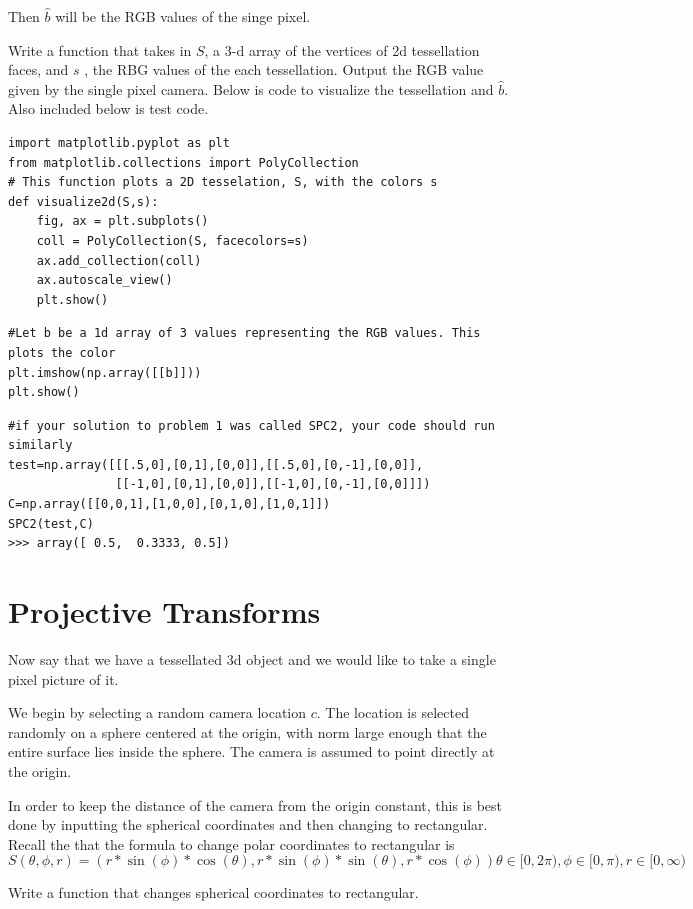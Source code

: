 Then $\hat{b}$ will be the RGB values of the singe pixel.

\begin{problem}
Write a function that takes in $S$, a 3-d array of the vertices of 2d tessellation faces, and $s$ , the RBG values of the each tessellation. Output the RGB value given by the single pixel camera. Below is code to visualize the tessellation and $\hat{b}$.  Also included below is test code.
\end{problem}

\begin{lstlisting}
import matplotlib.pyplot as plt
from matplotlib.collections import PolyCollection
# This function plots a 2D tesselation, S, with the colors s 
def visualize2d(S,s):
    fig, ax = plt.subplots()
    coll = PolyCollection(S, facecolors=s)
    ax.add_collection(coll)
    ax.autoscale_view()
    plt.show()
\end{lstlisting}
\begin{lstlisting}
#Let b be a 1d array of 3 values representing the RGB values. This plots the color
plt.imshow(np.array([[b]]))
plt.show()
\end{lstlisting}
\begin{lstlisting}
#if your solution to problem 1 was called SPC2, your code should run similarly
test=np.array([[[.5,0],[0,1],[0,0]],[[.5,0],[0,-1],[0,0]],
               [[-1,0],[0,1],[0,0]],[[-1,0],[0,-1],[0,0]]])
C=np.array([[0,0,1],[1,0,0],[0,1,0],[1,0,1]])
SPC2(test,C)
>>> array([ 0.5,  0.3333, 0.5])
\end{lstlisting}

\section*{Projective Transforms}
Now say that we have a tessellated 3d object and we would like to take a single pixel picture of it.

We begin by selecting a random camera location $c$. The location is selected randomly on a sphere centered at the origin, with norm large enough that the entire surface lies inside the sphere. The camera is assumed to point directly at the origin.

In order to keep the distance of the camera from the origin constant, this is best done by inputting the spherical coordinates and then changing to rectangular. Recall the that the formula to change polar coordinates to rectangular is 
\[
S(\theta,\phi,r)=(r*\sin(\phi)*\cos(\theta),r*\sin(\phi)*\sin(\theta),r*\cos(\phi))
\theta \in [0,2\pi),\phi \in [0,\pi), r \in [0,\infty)
\]
\begin{problem}
Write a function that changes spherical coordinates to rectangular.
\end{problem}

